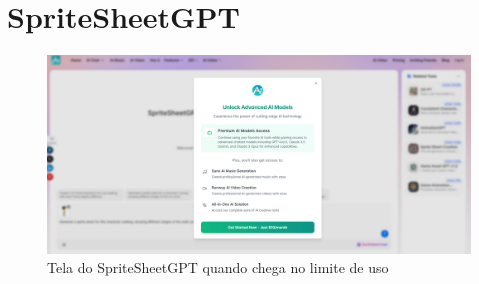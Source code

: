\FloatBarrier
\section{SpriteSheetGPT}
\label{s.spritesheetGPTApendice}

\begin{figure}[htbp]
    \centering
    \caption{\small Tela do SpriteSheetGPT quando chega no limite de uso}
    \label{fig:yesAILimitado}
    \includegraphics[width=1\linewidth]{figs/yesAI/telaLimitado.PNG}
\end{figure}


